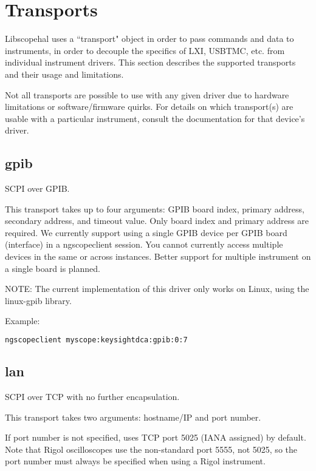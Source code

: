 \chapter{Transports}
\label{sec:transports}

Libscopehal uses a ``transport" object in order to pass commands and data to instruments, in order to decouple the
specifics of LXI, USBTMC, etc. from individual instrument drivers. This section describes the supported transports and
their usage and limitations.

Not all transports are possible to use with any given driver due to hardware limitations or software/firmware quirks.
For details on which transport(s) are usable with a particular instrument, consult the documentation for that device's
driver.

\section{gpib}

SCPI over GPIB.

This transport takes up to four arguments: GPIB board index, primary address, secondary address, and timeout value.
Only board index and primary address are required. We currently support using a single GPIB device per GPIB board
(interface) in a ngscopeclient session. You cannot currently access multiple devices in the same or across instances.
Better support for multiple instrument on a single board is planned.

NOTE: The current implementation of this driver only works on Linux, using the linux-gpib library.

Example:
\begin{lstlisting}[language=sh, numbers=none]
ngscopeclient myscope:keysightdca:gpib:0:7
\end{lstlisting}

\section{lan}

SCPI over TCP with no further encapsulation.

This transport takes two arguments: hostname/IP and port number.

If port number is not specified, uses TCP port 5025 (IANA assigned) by default. Note that Rigol oscilloscopes use the
non-standard port 5555, not 5025, so the port number must always be specified when using a Rigol instrument.

